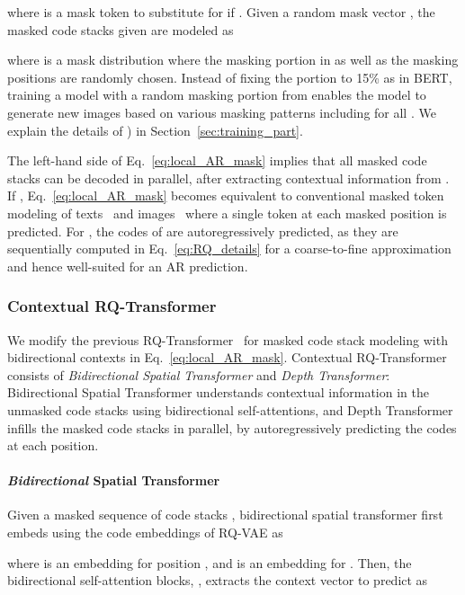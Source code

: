 \documentclass{article}
\begin{document}
where  is a mask token to substitute for  if .
Given a random mask vector , the masked code stacks given  are modeled as

where  is a mask distribution where the masking portion  in  as well as the masking positions are randomly chosen.
Instead of fixing the portion to 15\% as in BERT, training a model with a random masking portion from  enables the model to generate new images based on various masking patterns including  for all .
We explain the details of ) in Section~\ref{sec:training_part}.


The left-hand side of Eq.~\ref{eq:local_AR_mask} implies that all masked code stacks can be decoded in parallel, after extracting contextual information from .
If , Eq.~\ref{eq:local_AR_mask} becomes equivalent to conventional masked token modeling of texts~\cite{BERT} and images~\cite{MaskGIT,ShowMeWhat} where a single token at each masked position is predicted.
For , the  codes of  are autoregressively predicted, as they are sequentially computed in Eq.~\ref{eq:RQ_details} for a coarse-to-fine approximation and hence well-suited for an AR prediction.








\subsubsection{Contextual RQ-Transformer}\label{sec:RQ-Transformer}
We modify the previous RQ-Transformer~\cite{RQVAE} for masked code stack modeling with bidirectional contexts in Eq.~\ref{eq:local_AR_mask}.
Contextual RQ-Transformer consists of \emph{Bidirectional Spatial Transformer} and \emph{Depth Transformer}:
Bidirectional Spatial Transformer understands contextual information in the unmasked code stacks using bidirectional self-attentions, and Depth Transformer infills the masked code stacks in parallel, by autoregressively predicting the  codes at each position.

\paragraph{\emph{Bidirectional} Spatial Transformer} 
Given a masked sequence of code stacks , bidirectional spatial transformer first embeds  using the code embeddings of RQ-VAE as

where  is an embedding for position , and  is an embedding for . 
Then, the bidirectional self-attention blocks, , extracts the context vector  to predict  as
\end{document}
